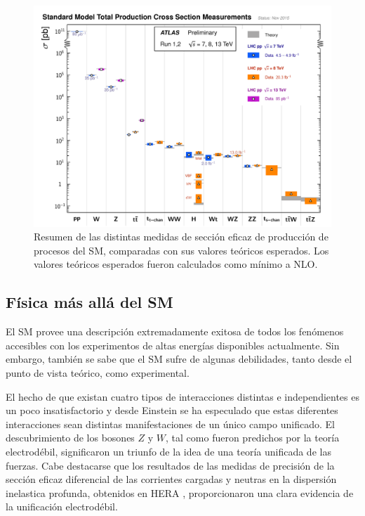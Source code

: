 \begin{figure}[!htb]
  \centering
  \includegraphics[width=1\textwidth]{figures/ATLAS_a_SMSummary_TotalXsect_new.pdf}
  \caption{Resumen de las distintas medidas de sección eficaz de producción de
    procesos del SM, comparadas con sus valores teóricos esperados.
    Los valores teóricos esperados fueron calculados como mínimo a NLO\cite{ATLASSM}.}
  \label{fig:sm_atlas_xs}
\end{figure}




\subsection{Física más allá del SM}

El SM provee una descripción extremadamente exitosa de todos los fenómenos
accesibles con los experimentos de altas energías disponibles actualmente.
Sin embargo,
también se sabe que el SM sufre de algunas debilidades, tanto desde el punto de
vista teórico, como experimental.

El hecho de que existan cuatro tipos de interacciones distintas e independientes
es un poco insatisfactorio y desde Einstein se ha especulado que estas
diferentes interacciones sean distintas manifestaciones de un único campo
unificado. El descubrimiento de los bosones $Z$ y $W$, tal como fueron predichos
por la teoría electrodébil, significaron un triunfo de la idea de una teoría unificada de las
fuerzas. Cabe destacarse que los resultados de las medidas de precisión de la sección
eficaz diferencial de las corrientes cargadas y neutras en la dispersión inelastica
profunda, obtenidos en HERA \cite{Hera}, proporcionaron una clara evidencia de la unificación
electrodébil.


